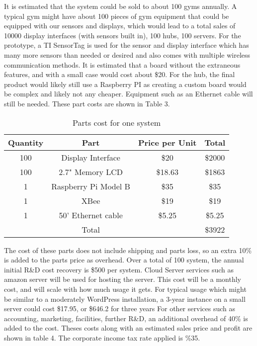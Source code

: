 \documentclass[PPFS.tex]{template/subfiles}
\begin{document}
        It is estimated that the system could be sold to about 100 gyms annually. A typical gym might have about 100 pieces of gym equipment that could be equipped with our sensors and displays, which would lead to a total sales of 10000 display interfaces (with sensors built in), 100 hubs, 100 servers. 
        For the prototype, a TI SensorTag is used for the sensor and display interface which has many more sensors than needed or desired and also comes with multiple wireless communication methods. It is estimated that a board without the extraneous features, and with a small case would cost about \$20.
        For the hub, the final product would likely still use a Raspberry PI as creating a custom board would be complex and likely not any cheaper. Equipment such as an Ethernet cable will still be needed.
        These part costs are shown in Table 3.
        
        \begin{table}[h!]
        	\begin{center}
        		\caption{Parts cost for one system}
        		\begin{tabular}{|c|c|c|c|}
        			\hline
        			Quantity & Part & Price per Unit & Total\\
        			\hline
        			100 & Display Interface & \$20 & \$2000\\
        			\hline
        			100 & 2.7" Memory LCD & \$18.63 \cite{mouserMemoryLCD} & \$1863\\
        			\hline
        			1 & Raspberry Pi Model B & \$35 \cite{alliedRaspberryPi} & \$35\\
        			\hline
        			1 & XBee & \$19 \cite{mouserXBEE} & \$19\\
        			\hline
        			1 & 50' Ethernet cable & \$5.25 \cite{amazonEthernetCable} & \$5.25\\
        			\hline
        			&Total&& \$3922\\
        			\hline
        		\end{tabular}
        	\end{center}
        \end{table}
        
        The cost of these parts does not include shipping and parts loss, so an extra 10\% is added to the parts price as overhead. 
        Over a total of 100 system, the annual initial R\&D cost recovery is \$500 per system.
        Cloud Server services such as amazon server will be used for hosting the server. This cost will be a monthly cost, and will scale with how much usage it gets. For typical usage which might be similar to a moderately WordPress installation, a 3-year instance on a small server could cost \$17.95, or \$646.2 for three years \cite{wordPressEstimate}
        For other services such as accounting, marketing, facilities, further R\&D, an additional overhead of 40\% is added to the cost.
        Theses costs along with an estimated sales price and profit are shown in table 4. The corporate income tax rate applied is \%35.
        
\end{document}
